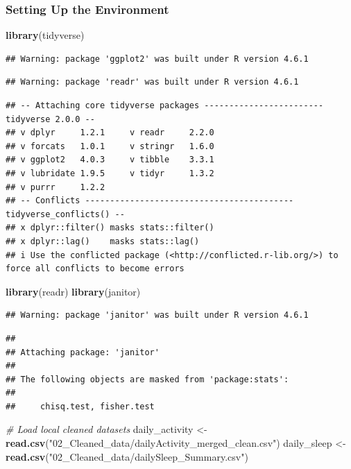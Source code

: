 \documentclass[
]{article}
\newenvironment{Shaded}{\begin{snugshade}}{\end{snugshade}}
\newcommand{\CommentTok}[1]{\textcolor[rgb]{0.56,0.35,0.01}{\textit{#1}}}
\newcommand{\FunctionTok}[1]{\textcolor[rgb]{0.13,0.29,0.53}{\textbf{#1}}}
\newcommand{\NormalTok}[1]{#1}
\newcommand{\OtherTok}[1]{\textcolor[rgb]{0.56,0.35,0.01}{#1}}
\newcommand{\StringTok}[1]{\textcolor[rgb]{0.31,0.60,0.02}{#1}}
\begin{document}
\subsubsection{Setting Up the
Environment}\label{setting-up-the-environment}

\begin{Shaded}
\begin{Highlighting}[]
\FunctionTok{library}\NormalTok{(tidyverse)}
\end{Highlighting}
\end{Shaded}

\begin{verbatim}
## Warning: package 'ggplot2' was built under R version 4.6.1
\end{verbatim}

\begin{verbatim}
## Warning: package 'readr' was built under R version 4.6.1
\end{verbatim}

\begin{verbatim}
## -- Attaching core tidyverse packages ------------------------ tidyverse 2.0.0 --
## v dplyr     1.2.1     v readr     2.2.0
## v forcats   1.0.1     v stringr   1.6.0
## v ggplot2   4.0.3     v tibble    3.3.1
## v lubridate 1.9.5     v tidyr     1.3.2
## v purrr     1.2.2     
## -- Conflicts ------------------------------------------ tidyverse_conflicts() --
## x dplyr::filter() masks stats::filter()
## x dplyr::lag()    masks stats::lag()
## i Use the conflicted package (<http://conflicted.r-lib.org/>) to force all conflicts to become errors
\end{verbatim}

\begin{Shaded}
\begin{Highlighting}[]
\FunctionTok{library}\NormalTok{(readr)}
\FunctionTok{library}\NormalTok{(janitor)}
\end{Highlighting}
\end{Shaded}

\begin{verbatim}
## Warning: package 'janitor' was built under R version 4.6.1
\end{verbatim}

\begin{verbatim}
## 
## Attaching package: 'janitor'
## 
## The following objects are masked from 'package:stats':
## 
##     chisq.test, fisher.test
\end{verbatim}

\begin{Shaded}
\begin{Highlighting}[]
\CommentTok{\# Load local cleaned datasets}
\NormalTok{daily\_activity }\OtherTok{\textless{}{-}} \FunctionTok{read.csv}\NormalTok{(}\StringTok{"02\_Cleaned\_data/dailyActivity\_merged\_clean.csv"}\NormalTok{)}
\NormalTok{daily\_sleep }\OtherTok{\textless{}{-}} \FunctionTok{read.csv}\NormalTok{(}\StringTok{"02\_Cleaned\_data/dailySleep\_Summary.csv"}\NormalTok{)}
\end{Highlighting}
\end{Shaded}
\end{document}
